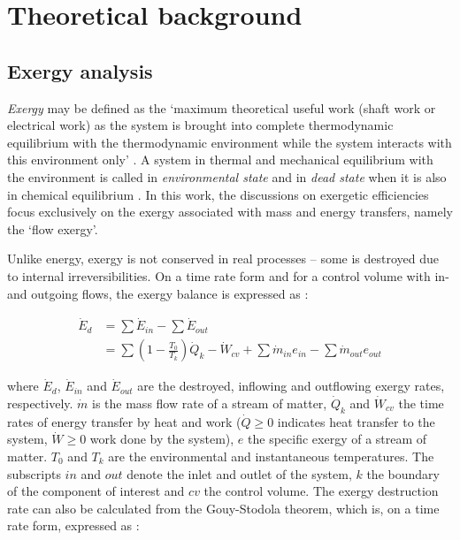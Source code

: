 \documentclass[times,3p]{elsarticle}
\begin{document}

\section{Theoretical background}
\label{sec:background}

\subsection{Exergy analysis}
\label{subsec:exergy_analysis}

\emph{Exergy} may be defined as the `maximum theoretical useful work (shaft work or electrical work) as the system is brought into complete thermodynamic equilibrium with the thermodynamic environment while the system interacts with this environment only' \cite{BejanAdrian;TsatsaronisGeorge;Moran1996,Moran1998,Thermoeconomics2001}. A system in thermal and mechanical equilibrium with the environment is called in \emph{environmental state} and in \emph{dead state} when it is also in chemical equilibrium \cite{Kotas1995}. In this work, the discussions on exergetic efficiencies focus exclusively on the exergy associated with mass and energy transfers, namely the `flow exergy'. 

Unlike energy, exergy is not conserved in real processes -- some is destroyed due to internal irreversibilities. On a time rate form and for a control volume with in- and outgoing flows, the exergy balance is expressed as \cite{BejanAdrian;TsatsaronisGeorge;Moran1996}: 

	\begin{align}
		\dot{E}_d&=\sum \dot{E}_{in} - \sum \dot{E}_{out} \nonumber\\
					  &=\sum \left (1-\frac{T_0}{T_k} \right ) \dot{Q}_k-\dot{W}_{cv}+\sum \dot{m}_{in} e_{in} - \sum \dot{m}_{out} e_{out}
	\end{align}

	where $\dot{E}_d$, $\dot{E}_{in}$ and $\dot{E}_{out}$ are the destroyed, inflowing and outflowing exergy rates, respectively. $\dot{m}$ is the mass flow rate of a stream of matter, $\dot{Q}_k$ and $\dot{W}_{cv}$ the time rates of energy transfer by heat and work ($\dot{Q}\geq0$ indicates heat transfer to the system, $\dot{W}\geq0$ work done by the system), $e$ the specific exergy of a stream of matter. $T_0$ and $T_k$ are the environmental and instantaneous temperatures. The subscripts $in$ and $out$ denote the inlet and outlet of the system, $k$ the boundary of the component of interest and $cv$ the control volume. The exergy destruction rate can also be calculated from the Gouy-Stodola theorem, which is, on a time rate form, expressed as \cite{Bejan2006}:
\end{document}
